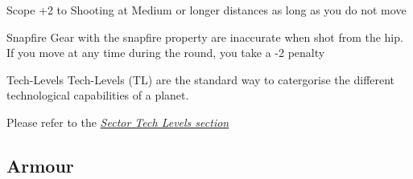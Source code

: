 \begin{multicols}{2}
\begin{genericsection}{Scope}
+2 to Shooting at Medium or longer distances as long as you do not move
\end{genericsection}

\begin{genericsection}{Snapfire}
Gear with the snapfire property are inaccurate when shot from the hip. If you move at any time during the round, you take a -2 penalty
\end{genericsection}

\begin{genericsection}{Tech-Levels}
Tech-Levels (TL) are the standard way to catergorise the different technological capabilities of a planet. 

Please refer to the \textit{\hyperref[sec:sector-tech-levels]{Sector Tech Levels section}}
\end{genericsection}

\end{multicols}

\subsection{Armour}

